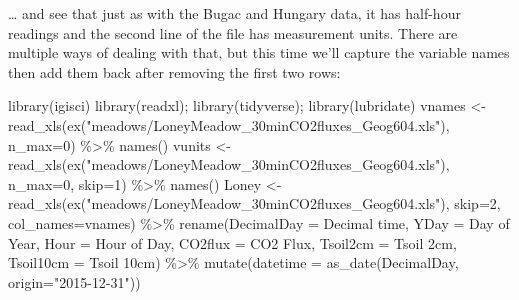\documentclass[
]{book}
\newenvironment{Shaded}{\begin{snugshade}}{\end{snugshade}}
\newcommand{\AttributeTok}[1]{\textcolor[rgb]{0.61,0.61,0.61}{#1}}
\newcommand{\DecValTok}[1]{\textcolor[rgb]{0.06,0.06,0.06}{#1}}
\newcommand{\FunctionTok}[1]{\textcolor[rgb]{0,0,0}{#1}}
\newcommand{\NormalTok}[1]{#1}
\newcommand{\OtherTok}[1]{\textcolor[rgb]{0.37,0.37,0.37}{#1}}
\newcommand{\SpecialCharTok}[1]{\textcolor[rgb]{0,0,0}{#1}}
\newcommand{\StringTok}[1]{\textcolor[rgb]{0.5,0.5,0.5}{#1}}
\begin{document}
\ldots{} and see that just as with the Bugac and Hungary data, it has half-hour readings and the second line of the file has measurement units. There are multiple ways of dealing with that, but this time we'll capture the variable names then add them back after removing the first two rows:

\begin{Shaded}
\begin{Highlighting}[]
\FunctionTok{library}\NormalTok{(igisci)}
\FunctionTok{library}\NormalTok{(readxl); }\FunctionTok{library}\NormalTok{(tidyverse); }\FunctionTok{library}\NormalTok{(lubridate)}
\NormalTok{vnames }\OtherTok{\textless{}{-}} \FunctionTok{read\_xls}\NormalTok{(}\FunctionTok{ex}\NormalTok{(}\StringTok{"meadows/LoneyMeadow\_30minCO2fluxes\_Geog604.xls"}\NormalTok{), }\AttributeTok{n\_max=}\DecValTok{0}\NormalTok{) }\SpecialCharTok{\%\textgreater{}\%} 
    \FunctionTok{names}\NormalTok{()}
\NormalTok{vunits }\OtherTok{\textless{}{-}} \FunctionTok{read\_xls}\NormalTok{(}\FunctionTok{ex}\NormalTok{(}\StringTok{"meadows/LoneyMeadow\_30minCO2fluxes\_Geog604.xls"}\NormalTok{), }\AttributeTok{n\_max=}\DecValTok{0}\NormalTok{, }\AttributeTok{skip=}\DecValTok{1}\NormalTok{) }\SpecialCharTok{\%\textgreater{}\%} 
    \FunctionTok{names}\NormalTok{()}
\NormalTok{Loney }\OtherTok{\textless{}{-}} \FunctionTok{read\_xls}\NormalTok{(}\FunctionTok{ex}\NormalTok{(}\StringTok{"meadows/LoneyMeadow\_30minCO2fluxes\_Geog604.xls"}\NormalTok{), }\AttributeTok{skip=}\DecValTok{2}\NormalTok{, }\AttributeTok{col\_names=}\NormalTok{vnames) }\SpecialCharTok{\%\textgreater{}\%}
  \FunctionTok{rename}\NormalTok{(}\AttributeTok{DecimalDay =} \StringTok{\textasciigrave{}}\AttributeTok{Decimal time}\StringTok{\textasciigrave{}}\NormalTok{,}
         \AttributeTok{YDay =} \StringTok{\textasciigrave{}}\AttributeTok{Day of Year}\StringTok{\textasciigrave{}}\NormalTok{,}
         \AttributeTok{Hour =} \StringTok{\textasciigrave{}}\AttributeTok{Hour of Day}\StringTok{\textasciigrave{}}\NormalTok{,}
         \AttributeTok{CO2flux =} \StringTok{\textasciigrave{}}\AttributeTok{CO2 Flux}\StringTok{\textasciigrave{}}\NormalTok{,}
         \AttributeTok{Tsoil2cm =} \StringTok{\textasciigrave{}}\AttributeTok{Tsoil 2cm}\StringTok{\textasciigrave{}}\NormalTok{,}
         \AttributeTok{Tsoil10cm =} \StringTok{\textasciigrave{}}\AttributeTok{Tsoil 10cm}\StringTok{\textasciigrave{}}\NormalTok{) }\SpecialCharTok{\%\textgreater{}\%} 
  \FunctionTok{mutate}\NormalTok{(}\AttributeTok{datetime =} \FunctionTok{as\_date}\NormalTok{(DecimalDay, }\AttributeTok{origin=}\StringTok{"2015{-}12{-}31"}\NormalTok{))}
\end{Highlighting}
\end{Shaded}
\end{document}
